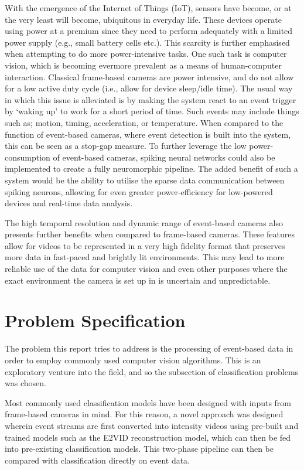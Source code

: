 With the emergence of the Internet of Things (IoT), sensors have become, or at the very least will become, ubiquitous in everyday life. These devices operate using power at a premium since they need to perform adequately with a limited power supply (e.g., small battery cells etc.). This scarcity is further emphasised when attempting to do more power-intensive tasks. One such task is computer vision, which is becoming evermore prevalent as a means of human-computer interaction. Classical frame-based cameras are power intensive, and do not allow for a low active duty cycle (i.e., allow for device sleep/idle time). The usual way in which this issue is alleviated is by making the system react to an event trigger by `waking up' to work for a short period of time. Such events may include things such as; motion, timing, acceleration, or temperature. When compared to the function of event-based cameras, where event detection is built into the system, this can be seen as a stop-gap measure. To further leverage the low power-consumption of event-based cameras, spiking neural networks could also be implemented to create a fully neuromorphic pipeline. The added benefit of such a system would be the ability to utilise the sparse data communication between spiking neurons, allowing for even greater power-efficiency for low-powered devices and real-time data analysis.

The high temporal resolution and dynamic range of event-based cameras also presents further benefits when compared to frame-based cameras. These features allow for videos to be represented in a very high fidelity format that preserves more data in fast-paced and brightly lit environments. This may lead to more reliable use of the data for computer vision and even other purposes where the exact environment the camera is set up in is uncertain and unpredictable.

\section{Problem Specification}

The problem this report tries to address is the processing of event-based data in order to employ commonly used computer vision algorithms. This is an exploratory venture into the field, and so the subsection of classification problems was chosen. 

Most commonly used classification models have been designed with inputs from frame-based cameras in mind. For this reason, a novel approach was designed wherein event streams are first converted into intensity videos using pre-built and trained models such as the E2VID reconstruction model\cite{spikingToVideo}, which can then be fed into pre-existing classification models. This two-phase pipeline can then be compared with classification directly on event data.

